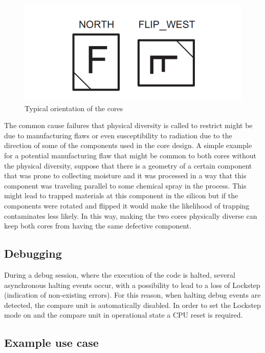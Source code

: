 \begin{figure}[H]

      \centering
      \includegraphics[width=0.8\linewidth]{images/lockstep_cpu_position.png}
      \caption{Typical orientation of the cores \citep{safety_maual_tms570ls31x}}
      \label{fig:lockstep_cpu_position}
    
\end{figure}

The common cause failures
that physical diversity is called to restrict might be due to manufacturing flaws
or even susceptibility to radiation due to the direction of some of the components
used in the core design. A simple example for a potential manufacturing flaw that
might be common to both cores without the physical diversity, suppose that there
is a geometry of a certain component that was prone to collecting moisture and it was processed in a way that this component was traveling parallel to some chemical spray in the process. This might lead to trapped materials at this component
in the silicon but if the components were rotated and flipped it would make the
likelihood of trapping contaminates less likely. In this way, making the two cores
physically diverse can keep both cores from having the same defective component. \citep{lockstep_analysis}

\subsection{Debugging}

During a debug session, where the execution of the code is halted, several asynchronous halting events occur, with a possibility to lead to a loss of Lockstep (indication of non-existing errors). For this reason, when halting debug events are
detected, the compare unit is automatically disabled. In order to set the Lockstep
mode on and the compare unit in operational state a CPU reset is required. \citep{TMS570LS31x21x_manual}

\subsection{Example use case \citep{lockstep_analysis}}

